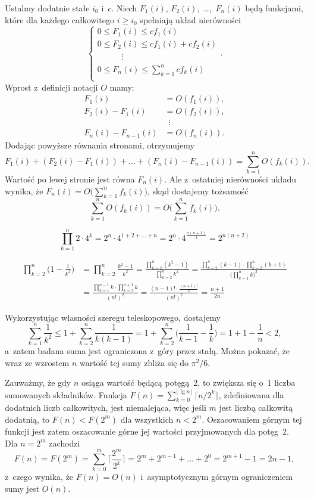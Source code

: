 Ustalmy dodatnie stałe $i_0$ i~$c$. Niech $F_1(i)$, $F_2(i)$,~\dots,~$F_n(i)$ będą funkcjami, które dla każdego całkowitego $i\ge i_0$ spełniają układ nierówności
\[
	\begin{cases}
		0 \le F_1(i) \le cf_1(i) \\
		0 \le F_2(i) \le cf_1(i)+cf_2(i) \\
		\phantom{0 \le F_2} \vdots \\
		0 \le F_n(i) \le \sum_{k=1}^ncf_k(i) \\
	\end{cases}.
\]
Wprost z~definicji notacji $O$ mamy:
\begin{align*}
	F_1(i) &= O(f_1(i)), \\
	F_2(i)-F_1(i) &= O(f_2(i)), \\
	& \,\,\,\vdots \\
	F_n(i)-F_{n-1}(i) &= O(f_n(i)).
\end{align*}
Dodając powyższe równania stronami, otrzymujemy
\[
	F_1(i)+(F_2(i)-F_1(i))+\dots+(F_n(i)-F_{n-1}(i)) = \sum_{k=1}^nO(f_k(i)).
\]
Wartość po lewej stronie jest równa $F_n(i)$. Ale z~ostatniej nierówności układu wynika, że $F_n(i)=O\bigl(\sum_{k=1}^nf_k(i)\bigr)$, skąd dostajemy tożsamość
\[
	\sum_{k=1}^nO(f_k(i)) = O\biggl(\sum_{k=1}^nf_k(i)\biggr).
\]

\exercise %
\[
	\prod_{k=1}^n2\cdot4^k = 2^n\cdot4^{1+2+\dots+n} = 2^n\cdot4^{\frac{n(n+1)}{2}} = 2^{n(n+2)}
\]

\exercise %
\begin{align*}
	\prod_{k=2}^n\biggl(1-\frac{1}{k^2}\biggr) &= \prod_{k=2}^n\frac{k^2-1}{k^2} = \frac{\prod_{k=2}^n(k^2-1)}{\prod_{k=2}^nk^2} = \frac{\prod_{k=2}^n(k-1)\cdot\prod_{k=2}^n(k+1)}{\bigl(\prod_{k=1}^nk\bigr)^2} \\[2mm]
	&= \frac{\prod_{k=1}^{n-1}k\cdot\prod_{k=3}^{n+1}k}{(n!)^2} = \frac{(n-1)!\cdot\frac{(n+1)!}{2}}{(n!)^2} = \frac{n+1}{2n}
\end{align*}


\exercise %
Wykorzystując własności szeregu teleskopowego, dostajemy
\[
	\sum_{k=1}^n\frac{1}{k^2} \le 1+\sum_{k=2}^n\frac{1}{k(k-1)} = 1+\sum_{k=2}^n\biggl(\frac{1}{k-1}-\frac{1}{k}\biggr) = 1+1-\frac{1}{n} < 2,
\]
a~zatem badana suma jest ograniczona z~góry przez stałą. Można pokazać, że wraz ze wzrostem $n$ wartość tej sumy zbliża się do $\pi^2\!/6$.

\exercise %
Zauważmy, że gdy $n$ osiąga wartość będącą potęgą~2, to zwiększa się o~1 liczba sumowanych składników. Funkcja $F(n)=\sum_{k=0}^{\lfloor\lg n\rfloor}\bigl\lceil n/2^k\bigr\rceil$, zdefiniowana dla dodatnich liczb całkowitych, jest niemalejąca, więc jeśli $m$ jest liczbą całkowitą dodatnią, to $F(n)<F(2^m)$ dla wszystkich $n<2^m$. Oszacowaniem górnym tej funkcji jest zatem oszacowanie górne jej wartości przyjmowanych dla potęg~2. Dla $n=2^m$ zachodzi
\[
	F(n) = F(2^m) = \sum_{k=0}^m\biggl\lceil\frac{2^m}{2^k}\biggr\rceil = 2^m+2^{m-1}+\dots+2^0 = 2^{m+1}-1 = 2n-1,
\]
z~czego wynika, że $F(n)=O(n)$ i~asymptotycznym górnym ograniczeniem sumy jest $O(n)$.

